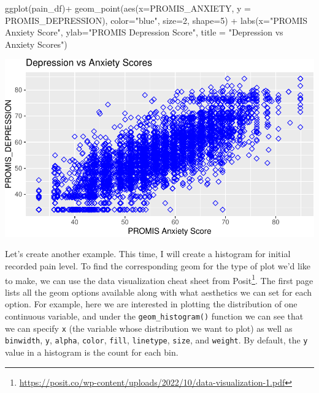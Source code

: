 \documentclass[
  letterpaper,
]{krantz}
\makeatletter
\newenvironment{Shaded}{\begin{snugshade}}{\end{snugshade}}
\newcommand{\AttributeTok}[1]{\textcolor[rgb]{0.40,0.45,0.13}{#1}}
\newcommand{\DecValTok}[1]{\textcolor[rgb]{0.68,0.00,0.00}{#1}}
\newcommand{\FunctionTok}[1]{\textcolor[rgb]{0.28,0.35,0.67}{#1}}
\newcommand{\NormalTok}[1]{\textcolor[rgb]{0.00,0.23,0.31}{#1}}
\newcommand{\SpecialCharTok}[1]{\textcolor[rgb]{0.37,0.37,0.37}{#1}}
\newcommand{\StringTok}[1]{\textcolor[rgb]{0.13,0.47,0.30}{#1}}
\renewcommand{\href}[2]{#2\footnote{\url{#1}}}
\newenvironment{kframe}{%
\medskip{}
\setlength{\fboxsep}{.8em}
 \def\at@end@of@kframe{}%
 \ifinner\ifhmode%
  \def\at@end@of@kframe{\end{minipage}}%
  \begin{minipage}{\columnwidth}%
 \fi\fi%
 \def\FrameCommand##1{\hskip\@totalleftmargin \hskip-\fboxsep
 \colorbox{shadecolor}{##1}\hskip-\fboxsep
     \hskip-\linewidth \hskip-\@totalleftmargin \hskip\columnwidth}%
 \MakeFramed {\advance\hsize-\width
   \@totalleftmargin\z@ \linewidth\hsize
   \@setminipage}}%
 {\par\unskip\endMakeFramed%
 \at@end@of@kframe}
\renewenvironment{Shaded}{\begin{kframe}}{\end{kframe}}
\makeatother
\begin{document}
\begin{Shaded}
\begin{Highlighting}[]
\FunctionTok{ggplot}\NormalTok{(pain\_df)}\SpecialCharTok{+}
  \FunctionTok{geom\_point}\NormalTok{(}\FunctionTok{aes}\NormalTok{(}\AttributeTok{x=}\NormalTok{PROMIS\_ANXIETY, }\AttributeTok{y =}\NormalTok{ PROMIS\_DEPRESSION), }
             \AttributeTok{color=}\StringTok{"blue"}\NormalTok{, }\AttributeTok{size=}\DecValTok{2}\NormalTok{, }\AttributeTok{shape=}\DecValTok{5}\NormalTok{) }\SpecialCharTok{+} 
  \FunctionTok{labs}\NormalTok{(}\AttributeTok{x=}\StringTok{"PROMIS Anxiety Score"}\NormalTok{, }\AttributeTok{ylab=}\StringTok{"PROMIS Depression Score"}\NormalTok{, }
       \AttributeTok{title =} \StringTok{"Depression vs Anxiety Scores"}\NormalTok{)}
\end{Highlighting}
\end{Shaded}

\begin{center}
\includegraphics[width=1\textwidth,height=\textheight]{book/visualization_ggplot_files/figure-pdf/unnamed-chunk-5-1.pdf}
\end{center}

Let's create another example. This time, I will create a histogram for
initial recorded pain level. To find the corresponding geom for the type
of plot we'd like to make, we can use the
\href{https://posit.co/wp-content/uploads/2022/10/data-visualization-1.pdf}{data
visualization cheat sheet from Posit}. The first page lists all the geom
options available along with what aesthetics we can set for each option.
For example, here we are interested in plotting the distribution of one
continuous variable, and under the \texttt{geom\_histogram()} function
we can see that we can specify \texttt{x} (the variable whose
distribution we want to plot) as well as \texttt{binwidth}, \texttt{y},
\texttt{alpha}, \texttt{color}, \texttt{fill}, \texttt{linetype},
\texttt{size}, and \texttt{weight}. By default, the \texttt{y} value in
a histogram is the count for each bin.
\end{document}

